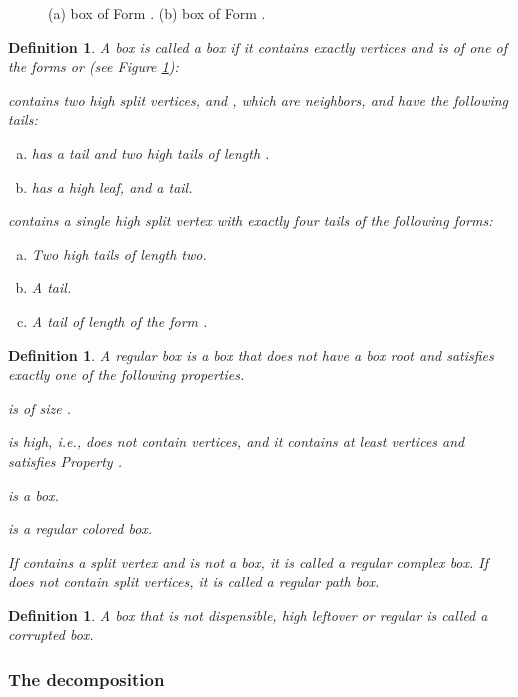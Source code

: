 \documentclass[11pt]{article}
\def\dnsitem{\vspace{-7pt}\item}
\def\dnssubitem{\vspace{-5pt}\item}
\newtheorem{definition}[theorem]{Definition}
\theoremstyle{definition}
\begin{document}
\begin{figure}[thbp]
  \caption{\sf (a)  box of Form . 
	      (b)  box of Form . 
	}
  \medskip
  \centering
  \label{fig:c12_box}
\end{figure}

\begin{definition}
A box  is called a \emph{ box} if it contains exactly  vertices and is of one of the forms  or  (see Figure \ref{fig:c12_box}):
\begin{description}
	\dnsitem[.]
	 contains two high split vertices,  and , which are neighbors, and have the following tails:
	\begin{enumerate}[(a)]
		\dnsitem  has a  tail and two high tails of length .
		\dnssubitem  has a high leaf, and a  tail.
	\end{enumerate}

	\dnsitem[.]
	 contains a single high split vertex with exactly four tails of the following forms:
	\begin{enumerate}[(a)]
		\dnsitem Two high tails of length two.
		\dnssubitem A  tail.
		\dnssubitem A tail of length  of the form .

	\end{enumerate}
\end{description}
\end{definition}


\begin{definition}
\label{def:regular_box}
A \emph{regular box} is a box  that does not have a box root and satisfies exactly one of the following properties.
\begin{description}
	\dnsitem[.]  is of size .
	\dnsitem[.]  is high, i.e., does not contain  vertices, and it contains at least  vertices and satisfies Property .
	\dnsitem[.]  is a  box.
	\dnsitem[.]  is a regular colored box.
\end{description}

If  contains a split vertex and is not a  box, it is called a \emph{regular complex} box.
If  does not contain split vertices, it is called a \emph{regular path} box.
\end{definition}

\begin{definition}
A box  that is not dispensible, high leftover or regular is called a \emph{corrupted box}. 
\end{definition}


\subsubsection{The decomposition}
\end{document}
